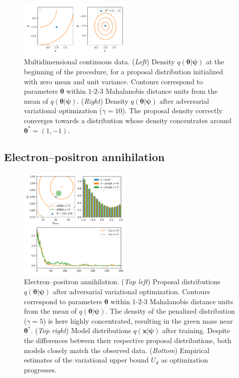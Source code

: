 \documentclass[twocolumn,superscriptaddress,aps]{revtex4-1}
\newcommand{\qxpsi}{q(\mathbf{x}|\bfpsi)}
\newcommand{\bftheta}{{\bm \theta}}
\newcommand{\bfpsi}{{\bm \psi}}
\theoremstyle{plain}
\begin{document}
\begin{figure}
    \centering
    \includegraphics[width=0.48\textwidth]{figures/multi.pdf}
    \caption{Multidimensional continuous data.
             ({\it Left}) Density $q(\bftheta|\bfpsi)$ at the beginning of the procedure, for a proposal distribution initialized with zero mean and unit variance.
                          Contours correspond to parameters $\bftheta$ within $1$-$2$-$3$ Mahalanobis distance units from the mean of $q(\bftheta|\bfpsi)$.
             ({\it Right}) Density $q(\bftheta|\bfpsi)$ after adversarial variational optimization ($\gamma=10$).
                           The proposal density correctly converges towards a distribution whose density concentrates around $\bftheta^* = (1, -1)$.
             }\label{fig:multi}
\end{figure}


\subsection{Electron--positron annihilation}

\begin{figure}
    \centering
    \includegraphics[width=0.48\textwidth]{figures/weinberg.pdf}
    \caption{Electron--positron annihilation.
    ({\it Top left}) Proposal distributions $q(\bftheta|\bfpsi)$ after adversarial variational optimization.
                     Contours correspond to parameters $\bftheta$ within $1$-$2$-$3$ Mahalanobis distance units from the mean of $q(\bftheta|\bfpsi)$.
                     The density of the penalized distribution ($\gamma=5$) is here highly concentrated, resulting in the green mass near $\bftheta^*$.
    ({\it Top right}) Model distributions $\qxpsi$ after training. Despite the differences between their respective proposal distributions, both models closely match the observed data.
    ({\it Bottom}) Empirical estimates of the variational upper bound $U_d$ as optimization progresses.
             }\label{fig:weinberg}
\end{figure}
\end{document}
